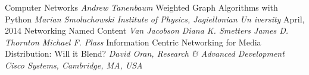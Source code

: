 \documentclass[11pt, oneside]{Thesis} %
\begin{document}
\begin{thebibliography}{9}

Computer Networks
\textit{Andrew Tanenbaum}%
Weighted Graph Algorithms with Python
\textit{Marian Smoluchowski Institute of Physics, Jagiellonian Un
iversity} April, 2014
%
Networking Named Content
\textit{Van Jacobson
Diana K. Smetters
James D. Thornton
Michael F. Plass}
%
Information Centric Networking for Media Distribution: 
Will it Blend?
\textit{David Oran, Research \& Advanced Development 
Cisco Systems, Cambridge, MA, USA}
%
%
%
%
%
%
%
%


\end{thebibliography}
\end{document}
